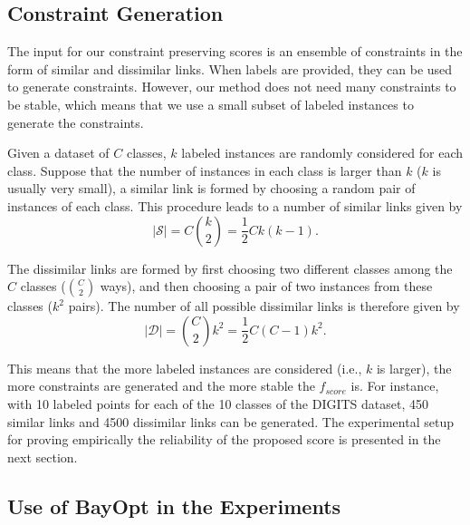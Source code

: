 \subsection{Constraint Generation}\label{sec:xp:constraint}

The input for our constraint preserving scores is an ensemble of constraints in the form of similar and dissimilar links.
When labels are provided, they can be used to generate constraints. However, our method does not need many constraints to be stable, which means that we use a small subset of labeled instances to generate the constraints.

Given a dataset of $C$ classes, $k$ labeled instances are randomly considered for each class.
Suppose that the number of instances in each class is larger than $k$ ($k$ is usually very small),
a similar link is formed by choosing a random pair of instances of each class.
This procedure leads to a number of similar links given by
\begin{equation}\label{eq:|S|}
    |\mathcal{S}| = C {k \choose 2} = \frac{1}{2} C k (k - 1).
\end{equation}

The dissimilar links are formed by first choosing two different classes among the $C$ classes (${C \choose 2}$ ways),
and then choosing a pair of two instances from these classes ($k^2$ pairs).
The number of all possible dissimilar links is therefore given by
\begin{equation}\label{eq:|D|}
    |\mathcal{D}| = {C \choose 2} k^2 = \frac{1}{2} C (C - 1) k^2.
\end{equation}

This means that the more labeled instances are considered (i.e., $k$ is larger), the more constraints are generated and the more stable the $f_{score}$ is.
For instance, with 10 labeled points for each of the 10 classes of the DIGITS dataset, 450 similar links and 4500 dissimilar links can be generated.
The experimental setup for proving empirically the reliability of the proposed score is presented in the next section.

\subsection{Use of BayOpt in the Experiments}\label{sec:xp:proof}

